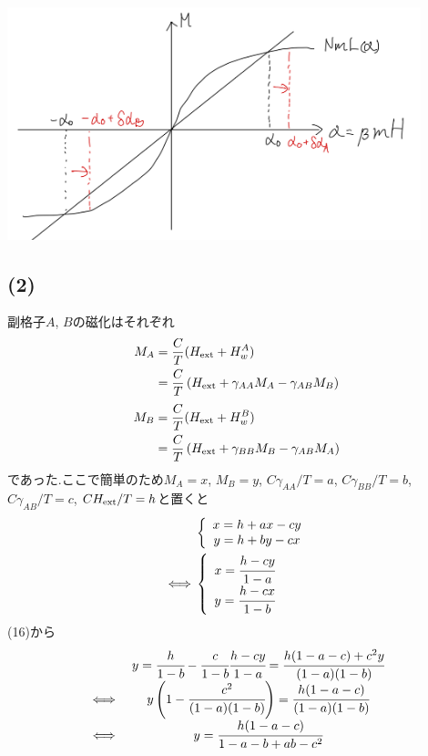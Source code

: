 \documentclass[uplatex,a4j,11pt,dvipdfmx]{jsarticle}
\makeatletter
\def\fgcaption{\def\@captype{figure}\caption}
\newcommand{\gaa}{\gamma_{AA}}
\newcommand{\gbb}{\gamma_{BB}}
\newcommand{\gab}{\gamma_{AB}}
\makeatother
\begin{document}
\begin{center}
  \includegraphics[width=12cm]{1_HM.png}
  \fgcaption{外部磁場による自己無撞着解の変化}
\end{center}
\subsection*{(2)}
副格子$A$, $B$の磁化はそれぞれ
\begin{align}
  \begin{split}
    M_A&=\frac{C}{T}(H_{\rm ext}+H_w^A)\\
    &=\frac{C}{T}\left(H_{\rm ext}+{\gaa}M_A-{\gab}M_B\right)
  \end{split}
\end{align}
\begin{align}
  \begin{split}
    M_B&=\frac{C}{T}(H_{\rm ext}+H_w^B)\\
    &=\frac{C}{T}\left(H_{\rm ext}+{\gbb}M_B-{\gab}M_A\right)
  \end{split}
\end{align}
であった.ここで簡単のため$M_A=x$, $M_B=y$, $C{\gaa}/T=a$,
$C{\gbb}/T=b$, $C{\gab}/T=c$, $CH_{\rm ext}/T=h$と置くと
\begin{align}
    &\left\{
    \begin{array}{c}
      x=h+ax-cy\\
      y=h+by-cx
    \end{array}\right.\\
    \iff&\left\{
    \begin{array}{c}
      x=\cfrac{h-cy}{1-a}\\
      y=\cfrac{h-cx}{1-b}
    \end{array}\right.
\end{align}
(16)から
\begin{align}
  \begin{array}{cc}
    &y=\cfrac{h}{1-b}-\cfrac{c}{1-b}\cfrac{h-cy}{1-a}=\cfrac{h(1-a-c)+c^2y}{(1-a)(1-b)}\\
    \iff&y\left(1-\cfrac{c^2}{(1-a)(1-b)}\right)=\cfrac{h(1-a-c)}{(1-a)(1-b)}\\
    \iff&y=\cfrac{h(1-a-c)}{1-a-b+ab-c^2}
  \end{array}
\end{align}
\end{document}
